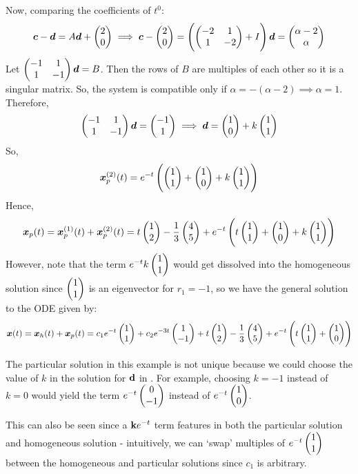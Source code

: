 \begin{eg}
	Now, comparing the coefficients of $t^0$:
	\[
	\bm{c} - \bm{d} = A\bm{d} + \begin{pmatrix}2\\0\end{pmatrix}
	\implies \bm{c} - \begin{pmatrix}2\\0\end{pmatrix} = \left(\begin{pmatrix}-2&1 \\ 1&-2\end{pmatrix} + I\right)\bm{d} = \begin{pmatrix}\alpha-2\\\alpha\end{pmatrix}
	\]
	Let $\begin{pmatrix}-1&1 \\ 1&-1\end{pmatrix}\bm{d} =B$. Then the rows of $B$ are multiples of each other so it is a singular matrix. So, the system is compatible only if $\alpha = -(\alpha - 2) \implies \alpha = 1$. Therefore,
	\begin{equation}\label{eq:nonhom2d}
		\begin{pmatrix}-1&1 \\ 1&-1\end{pmatrix}\bm{d} = \begin{pmatrix}-1\\1\end{pmatrix} \implies \bm{d} = \begin{pmatrix}1\\0\end{pmatrix} + k\begin{pmatrix}1\\1\end{pmatrix}
	\end{equation}
	So,
	\[\bm{x}_p^{(2)}(t) = e^{-t}\left(\begin{pmatrix}1\\1\end{pmatrix} + \begin{pmatrix}1\\0\end{pmatrix} + k\begin{pmatrix}1\\1\end{pmatrix}\right)
	\]
	Hence, 
	\[
	\bm{x}_p(t) = \bm{x}_p^{(1)}(t) + \bm{x}_p^{(2)}(t) = t\begin{pmatrix}1\\2\end{pmatrix} - \frac{1}{3}\begin{pmatrix}4\\5\end{pmatrix} + e^{-t}\left(t\begin{pmatrix}1\\1\end{pmatrix} + \begin{pmatrix}1\\0\end{pmatrix} + k\begin{pmatrix}1\\1\end{pmatrix}\right)
	\]
	However, note that the term $e^{-t}k\begin{pmatrix}1\\1\end{pmatrix}$ would get dissolved into the homogeneous solution since $\begin{pmatrix}1\\1\end{pmatrix}$ is an eigenvector for $r_1 = -1$, so we have the general solution to the ODE given by:
	\[
	\bm{x}(t) = \bm{x}_h(t) + \bm{x}_p(t) = c_1e^{-t}\begin{pmatrix}1\\1\end{pmatrix} + c_2e^{-3t}\begin{pmatrix}1\\-1\end{pmatrix} + t\begin{pmatrix}1\\2\end{pmatrix} - \frac{1}{3}\begin{pmatrix}4\\5\end{pmatrix} + e^{-t}\left(t\begin{pmatrix}1\\1\end{pmatrix} + \begin{pmatrix}1\\0\end{pmatrix} \right)
	\]
\end{eg}

\begin{remark}
	The particular solution in this example is not unique because we could choose the value of $k$ in the solution for $\textbf{d}$ in . For example, choosing $k=-1$ instead of $k=0$ would yield the term $e^{-t}\begin{pmatrix}0 \\ -1\end{pmatrix}$ instead of $e^{-t}\begin{pmatrix}1 \\ 0\end{pmatrix}$.
	
	This can also be seen since a $\textbf{k}e^{-t}$ term features in both the particular solution and homogeneous solution - intuitively, we can `swap' multiples of $e^{-t}\begin{pmatrix}1 \\ 1\end{pmatrix}$ between the homogeneous and particular solutions since $c_1$ is arbitrary.
\end{remark}

